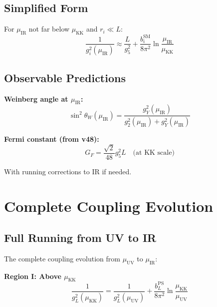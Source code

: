 \documentclass[11pt,a4paper]{article}
\begin{document}
\subsection{Simplified Form}
\label{subsec:simplified}

For $\mu_{\text{IR}}$ not far below $\mu_{\text{KK}}$ and $r_i \ll L$:
\begin{equation}
\label{eq:simplified-master}
\frac{1}{g_i^2(\mu_{\text{IR}})} \approx \frac{L}{g_5^2} + \frac{b_i^{\text{SM}}}{8\pi^2}\ln\frac{\mu_{\text{IR}}}{\mu_{\text{KK}}}
\end{equation}

\subsection{Observable Predictions}
\label{subsec:observables}

\textbf{Weinberg angle at $\mu_{\text{IR}}$:}
\begin{equation}
\label{eq:sin2-ir-final}
\sin^2\theta_W(\mu_{\text{IR}}) = \frac{g_Y^2(\mu_{\text{IR}})}{g_2^2(\mu_{\text{IR}}) + g_Y^2(\mu_{\text{IR}})}
\end{equation}

\textbf{Fermi constant (from v48):}
\begin{equation}
\label{eq:gf-final}
G_F = \frac{\sqrt{2}}{48}g_5^2 L \quad \text{(at KK scale)}
\end{equation}

With running corrections to IR if needed.

\section{Complete Coupling Evolution}
\label{sec:complete-evolution}

\subsection{Full Running from UV to IR}
\label{subsec:full-running}

The complete coupling evolution from $\mu_{\text{UV}}$ to $\mu_{\text{IR}}$:

\textbf{Region I: Above $\mu_{\text{KK}}$}
\begin{equation}
\label{eq:region-I-gL}
\frac{1}{g_L^2(\mu_{\text{KK}})} = \frac{1}{g_L^2(\mu_{\text{UV}})} + \frac{b_L^{\text{PS}}}{8\pi^2}\ln\frac{\mu_{\text{KK}}}{\mu_{\text{UV}}}
\end{equation}
\end{document}

